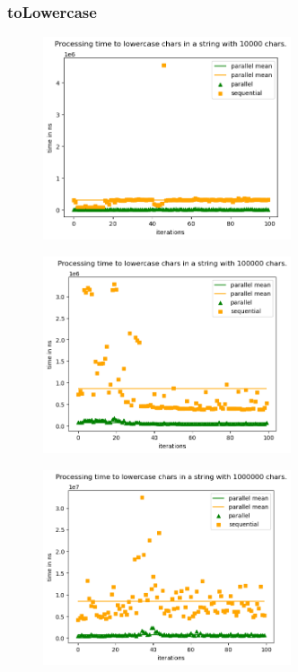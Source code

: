 \documentclass[plainarticle,zihtitle,german,final,hyperref,utf8]{zihpub}
\begin{document}
\subsubsection{toLowercase}
\begin{figure}[h]
	\begin{center}
		\includegraphics[width=0.65\textwidth]{images/comp_lower_10000.png}
	\end{center}
\end{figure}
\begin{figure}[h]
	\begin{center}
		\includegraphics[width=0.65\textwidth]{images/comp_lower_100000.png}
	\end{center}
\end{figure}
\begin{figure}[h]
	\begin{center}
		\includegraphics[width=0.65\textwidth]{images/comp_lower_1000000.png}
	\end{center}
\end{figure}
\end{document}
